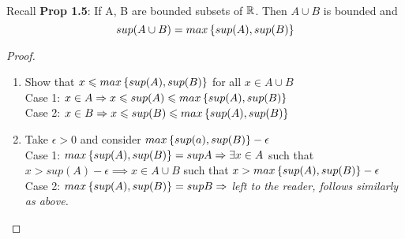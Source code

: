 \\

Recall \textbf{Prop 1.5}: 	If A, B are bounded subsets of $\mathbb{R}$. Then $A\cup B$ is bounded and
\[sup(A\cup B) = max\left\{ sup(A), sup(B) \right\}\]

\begin{proof}
  \begin{enumerate}[1]
    \item Show that $x \leqslant max\left\{ sup(A), sup(B) \right\}$ for all $x\in A\cup B$ \\
    Case 1: $x\in A \Rightarrow x \leqslant sup(A) \leqslant max\left\{ sup(A),sup(B) \right\}$ \\
    Case 2: $x\in B \Rightarrow x \leqslant sup(B) \leqslant max\left\{ sup(A),sup(B) \right\}$

    \item Take $\epsilon > 0$ and consider $max\left\{ sup(a), sup(B) \right\}-\epsilon$ \\
    Case 1: $max\left\{ sup(A), sup(B) \right\}=sup A \Rightarrow \exists x\in A$ such that $x>sup(A)-\epsilon \implies x \in A\cup B $ such that $x>max\left\{ sup(A), sup(B) \right\}-\epsilon$ \\
    Case 2: $max\left\{ sup(A), sup(B) \right\}=sup B \Rightarrow $ \textit{left to the reader, follows similarly as above. }
  \end{enumerate}
\end{proof}


